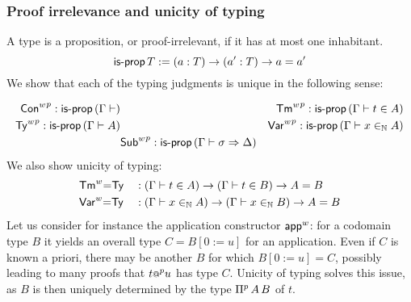 \subsubsection{Proof irrelevance and unicity of typing}
\label{ss:uniq-typing-types}
A type is a proposition, or proof-irrelevant, if it has at most one inhabitant.
  \[
    \mathsf{is\text{-}prop}\,T := (a : T) \rightarrow (a' : T) \rightarrow a = a'
  \]
We show that each of the typing judgments is unique in the
following sense:

\begin{align*}
    {{\mathsf{Con}}^w}^p
  : \mathsf{is\text{-}prop}\, (\Gamma\vdash)
 & &
    {{\mathsf{Tm}}^w}^p
  : \mathsf{is\text{-}prop}\, (\Gamma\vdash t \in A)
    \\
    {{\mathsf{Ty}}^w}^p
  : \mathsf{is\text{-}prop}\, (\Gamma\vdash A)
    &&
    {{\mathsf{Var}}^w}^p
  : \mathsf{is\text{-}prop}\, (\Gamma\vdash x \in_{\mathbb{N}} A)
  \\
  &
        {{\mathsf{Sub}}^w}^p
  : \mathsf{is\text{-}prop}\, (\Gamma\vdash \sigma \Rightarrow \Delta)
  \end{align*}
We also show unicity of typing:
\begin{alignat*}{5}
  &
  {\mathsf{Tm}}^w{=}\mathsf{Ty} & &:
  (\Gamma \vdash t \in A) \rightarrow
  (\Gamma \vdash t \in B) \rightarrow A = B
  \\
  &
  {\mathsf{Var}}^w{=}\mathsf{Ty} & &:
  (\Gamma \vdash x \in_{\mathbb{N}} A) \rightarrow
  (\Gamma \vdash x \in_{\mathbb{N}} B) \rightarrow A = B
  \end{alignat*}
Let us consider for instance the application constructor ${\mathsf{app}}^w$: for a codomain
type $B$ it yields an overall type $C=B[0 := u]$ for an application. Even
if $C$ is known a priori, there may be another $B$ for which $B[0 := u] = C$,
possibly leading to many proofs that $t{\mathop{{\scriptstyle @}}}^p u$ has type $C$. Unicity of typing
solves this issue, as $B$ is then uniquely determined by the type ${\Pi}^p\,A\,B$
of $t$.




